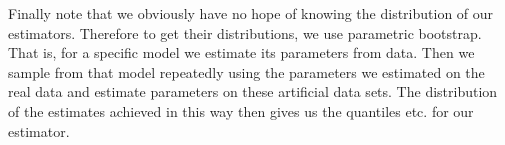Finally note that we obviously have no hope of knowing the distribution of our estimators. Therefore to get their distributions, we use parametric bootstrap. That is, for a specific model we estimate its parameters from data. Then we sample from that model repeatedly using the parameters we estimated on the real data and estimate parameters on these artificial data sets. The distribution of the estimates achieved in this way then gives us the quantiles etc. for our estimator.